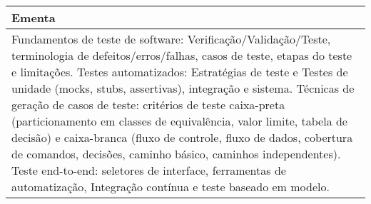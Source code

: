 \begin{quadro}[h!]
\begin{tabular}{|p{3cm} p{2cm} p{3cm} p{2cm} p{3cm} p{2cm}|}
\multicolumn{6}{|p{15cm}|}{\cellcolor{blue1} Ementa} \\\hline
\hline\multicolumn{6}{|p{15cm}|}{\scriptsize Fundamentos de teste de software: Verificação/Validação/Teste, terminologia de defeitos/erros/falhas, casos de teste, etapas do teste e limitações. Testes automatizados: Estratégias de teste e Testes de unidade (mocks, stubs, assertivas), integração e sistema. Técnicas de geração de casos de teste: critérios de teste caixa-preta (particionamento em classes de equivalência, valor limite, tabela de decisão) e caixa-branca (fluxo de controle, fluxo de dados, cobertura de comandos, decisões, caminho básico, caminhos independentes). Teste end-to-end: seletores de interface, ferramentas de automatização, Integração contínua e teste baseado em modelo.}\\\hline
\hline
	\end{tabular}
\end{quadro}
